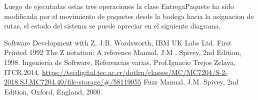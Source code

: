 \documentclass[12pt,a4paper]{article}
\begin{document}
Luego de ejecutadas estas tres operaciones la clase EntregaPaquete ha sido modificada por el movimiento de paquetes desde la bodega hacia la asignacion de rutas, el estado del sistema se puede apreciar en el siguiente diagrama.

\begin{center}
\end{center}

\newpage
\begin{thebibliography}{00}
 Software Development with Z, J.B. Wordsworth, IBM UK Labs Ltd. First Printed 1992
 The Z notation: A reference Manual, J.M . Spivey, 2nd Edition, 1998.
 Ingeniería de Software, Referencias varias, Prof.Ignacio Trejos Zelaya, ITCR.2014. \url{https://tecdigital.tec.ac.cr/dotlrn/classes/MC/MC7204/S-2-2018.SJ.MC7204.40/file-storage/#/58119055}
 Fuzz Manual, J.M. Spivey, 2nd Edition, Oxford, England, 2000.
\end{thebibliography}
\end{document}

